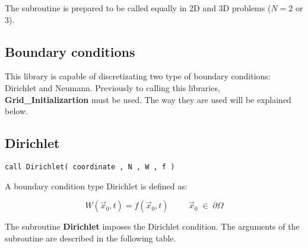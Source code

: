 The subroutine is prepared to be called equally in 2D and 3D problems ($N = 2$ or $3$). 

\subsection{Boundary conditions}


This library is capable of discretizating two type of boundary conditions: Dirichlet and Neumann. Previously to calling this libraries, \textbf{Grid\_Initializartion} must be used. The way they are used will be explained below.

\subsection*{Dirichlet }

\lstset{language=Fortran}
\begin{lstlisting}[frame=trBL]
call Dirichlet( coordinate , N , W , f )\end{lstlisting}

A boundary condition type Dirichlet is defined as:

\begin{equation*}
W(\vec{x}_{0},t)= f(\vec{x}_{0}, t)   \hspace{1cm}   \vec{x}_{0} \; \in \; \partial \Omega
\end{equation*}

The subroutine \textbf{Dirichlet} imposes the Dirichlet condition. The arguments of the subroutine are described in the following table.

